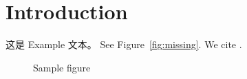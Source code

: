 \section{Introduction}
这是 Example 文本。
See Figure~\ref{fig:missing}.
We cite \cite{ref1,missingkey}.

\begin{figure}
\centering
	\caption{Sample figure}
\end{figure}

